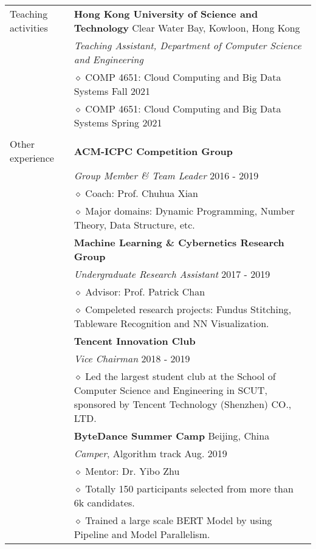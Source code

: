 \documentclass[letterpaper, 11pt]{article}
\begin{document}
\begin{longtable}{p{1.3in}p{4.8in}}

{Teaching activities}
& \textbf{Hong Kong University of Science and Technology} \hfill Clear Water Bay, Kowloon, Hong Kong \\
& \textit{Teaching Assistant, Department of Computer Science and Engineering} \\
& $\diamond$ COMP 4651: Cloud Computing and Big Data Systems \hfill Fall 2021 \\
& $\diamond$ COMP 4651: Cloud Computing and Big Data Systems \hfill Spring 2021 \\
& \\

{Other experience}
& \textbf{ACM-ICPC Competition Group} \\
& \textit{Group Member \& Team Leader} \hfill 2016 - 2019 \\
& $\diamond$ Coach: Prof. Chuhua Xian \\
& $\diamond$ Major domains: Dynamic Programming, Number Theory, Data Structure, etc. \\

& \textbf{Machine Learning \& Cybernetics Research Group} \\
& \textit{Undergraduate Research Assistant} \hfill 2017 - 2019 \\
& $\diamond$ Advisor: Prof. Patrick Chan \\
& $\diamond$ Compeleted research projects: Fundus Stitching, Tableware Recognition and NN Visualization. \\

& \textbf{Tencent Innovation Club} \\
& \textit{Vice Chairman} \hfill 2018 - 2019 \\
& $\diamond$ Led the largest student club at the School of Computer Science and Engineering in SCUT, sponsored by Tencent Technology (Shenzhen) CO., LTD. \\

& \textbf{ByteDance Summer Camp} \hfill Beijing, China \\
& \textit{Camper}, Algorithm track \hfill Aug. 2019 \\
& $\diamond$ Mentor: Dr. Yibo Zhu \\
& $\diamond$ Totally 150 participants selected from more than 6k candidates. \\
& $\diamond$ Trained a large scale BERT Model by using Pipeline and Model Parallelism. \\


\end{longtable}
\end{document}
